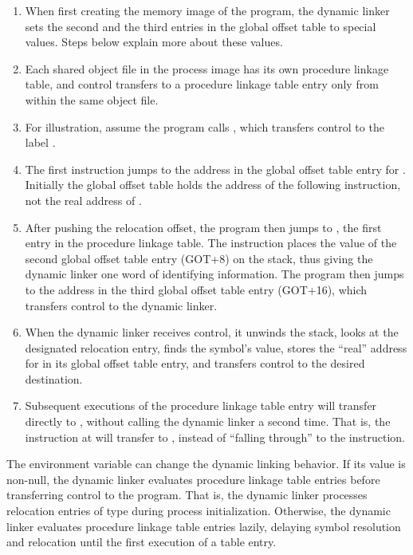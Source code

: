 \begin{enumerate}
\item When first creating the memory image of the program, the dynamic
  linker sets the second and the third entries in the global offset
  table to special values.  Steps below explain more about these
  values.
\item Each shared object file in the process image has its own
  procedure linkage table, and control transfers to a procedure
  linkage table entry only from within the same object file.
\item For illustration, assume the program calls , which
  transfers control to the label .
\item The first instruction jumps to the address in the global offset
  table entry for .  Initially the global offset table
  holds the address of the following  instruction, not the
  real address of .
\item After pushing the relocation offset, the program then jumps to
  , the first entry in the procedure linkage table.  The
   instruction places the value of the second global
  offset table entry (GOT+8) on the stack, thus giving the dynamic
  linker one word of identifying information.  The program then jumps
  to the address in the third global offset table entry (GOT+16),
  which transfers control to the dynamic linker.
\item When the dynamic linker receives control, it unwinds the stack,
  looks at the designated relocation entry, finds the symbol's value,
  stores the ``real'' address for  in its global offset
  table entry, and transfers control to the desired destination.
\item Subsequent executions of the procedure linkage table entry will
  transfer directly to , without calling the dynamic
  linker a second time.  That is, the  instruction at
   will transfer to , instead of ``falling
  through'' to the  instruction.
\end{enumerate}

The  environment variable can change the dynamic
linking behavior.  If its value is non-null, the dynamic linker
evaluates procedure linkage table entries before transferring control
to the program.  That is, the dynamic linker processes relocation
entries of type  
during process initialization.  Otherwise, the dynamic linker
evaluates procedure linkage table entries lazily, delaying symbol
resolution and relocation until the first execution of a table entry.

